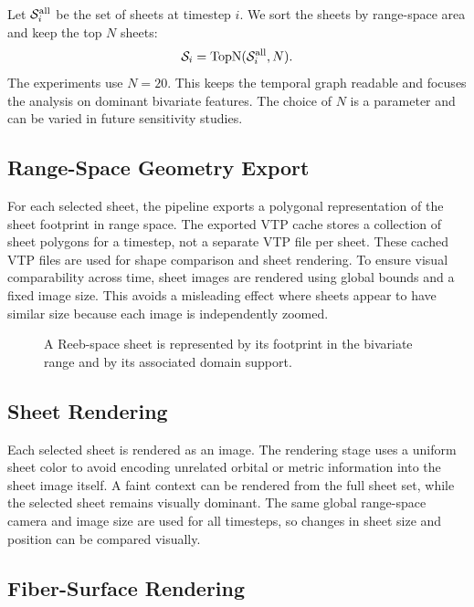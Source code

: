 Let \(\mathcal{S}_i^\mathrm{all}\) be the set of sheets at timestep \(i\). We sort
the sheets by range-space area and keep the top \(N\) sheets:
\[
\mathcal{S}_i = \operatorname{TopN}(\mathcal{S}_i^\mathrm{all}, N).
\]
The experiments use \(N=20\). This keeps the temporal graph readable and
focuses the analysis on dominant bivariate features. The choice of \(N\) is a
parameter and can be varied in future sensitivity studies.

\subsection{Range-Space Geometry Export}

For each selected sheet, the pipeline exports a polygonal representation of the
sheet footprint in range space. The exported VTP cache stores a collection of
sheet polygons for a timestep, not a separate VTP file per sheet. These cached
VTP files are used for shape comparison and sheet rendering. To ensure visual
comparability across time, sheet images are rendered using global bounds and a
fixed image size. This avoids a misleading effect where sheets appear to have
similar size because each image is independently zoomed.

\begin{figure}[t]
  \caption{A Reeb-space sheet is represented by its footprint in the bivariate
  range and by its associated domain support.}
  \label{fig:sheet-definition}
\end{figure}

\subsection{Sheet Rendering}

Each selected sheet is rendered as an image. The rendering stage uses a uniform
sheet color to avoid encoding unrelated orbital or metric information into the
sheet image itself. A faint context can be rendered from the full sheet set,
while the selected sheet remains visually dominant. The same global range-space
camera and image size are used for all timesteps, so changes in sheet size and
position can be compared visually.

\subsection{Fiber-Surface Rendering}

